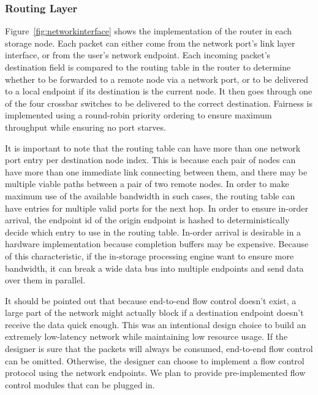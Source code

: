 \subsubsection{Routing Layer}

Figure~\ref{fig:networkinterface} shows the implementation of the router in each
storage node. Each packet can either come from the network port's link layer
interface, or from the user's network endpoint. Each incoming packet's
destination field is compared to the routing table in the router to determine
whether to be forwarded to a remote node via a network port, or to be delivered
to a local endpoint if its destination is the current node. It then goes through
one of the four crossbar switches to be delivered to the correct destination. 
Fairness is implemented using a round-robin priority ordering to ensure maximum
throughput while ensuring no port starves.

It is important to note that the routing table can have more than one network
port entry per destination node index. This is because each pair of nodes can
have more than one immediate link connecting between them, and there may be
multiple viable paths between a pair of two remote nodes. In order to make
maximum use of the available bandwidth in such cases, the routing table can have
entries for multiple valid ports for the next hop. In order to ensure in-order
arrival, the endpoint id of the origin endpoint is hashed to deterministically
decide which entry to use in the routing table. In-order arrival is desirable in
a hardware implementation because completion buffers may be expensive.
Because of this characteristic, if the in-storage processing engine want to
ensure more bandwidth, it can break a wide data bus into multiple endpoints and
send data over them in parallel.

It should be pointed out that because end-to-end flow control doesn't exist, a
large part of the network might actually block if a destination endpoint doesn't
receive the data quick enough. This was an intentional design choice to build an
extremely low-latency network while maintaining low resource usage. If the designer is sure that the packets will
always be consumed, end-to-end flow control can be omitted. Otherwise, the
designer can choose to implement a flow control protocol using the network
endpoints. We plan to provide pre-implemented flow control modules that can be
plugged in.

